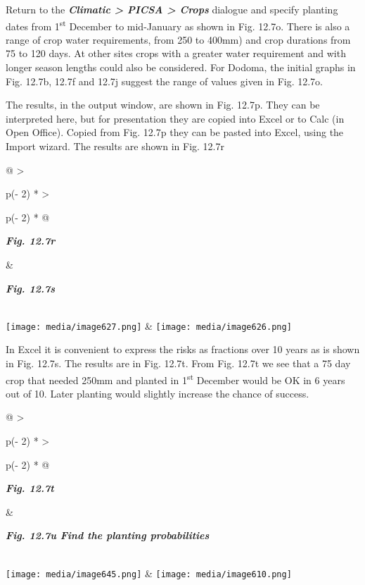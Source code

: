 \documentclass[
  letterpaper,
  DIV=11,
  numbers=noendperiod]{scrreprt}
\begin{document}
Return to the \textbf{\emph{Climatic \textgreater{} PICSA \textgreater{}
Crops}} dialogue and specify planting dates from 1\textsuperscript{st}
December to mid-January as shown in Fig. 12.7o. There is also a range of
crop water requirements, from 250 to 400mm) and crop durations from 75
to 120 days. At other sites crops with a greater water requirement and
with longer season lengths could also be considered. For Dodoma, the
initial graphs in Fig. 12.7b, 12.7f and 12.7j suggest the range of
values given in Fig. 12.7o.

The results, in the output window, are shown in Fig. 12.7p. They can be
interpreted here, but for presentation they are copied into Excel or to
Calc (in Open Office). Copied from Fig. 12.7p they can be pasted into
Excel, using the Import wizard. The results are shown in Fig. 12.7r

\begin{longtable}[]{@{}
  >{\raggedright\arraybackslash}p{(\columnwidth - 2\tabcolsep) * }
  >{\raggedright\arraybackslash}p{(\columnwidth - 2\tabcolsep) * }@{}}
\toprule\noalign{}
\begin{minipage}[b]{\linewidth}\raggedright
\textbf{\emph{Fig. 12.7r}}
\end{minipage} & \begin{minipage}[b]{\linewidth}\raggedright
\textbf{\emph{Fig. 12.7s}}
\end{minipage} \\
\midrule\noalign{}
\endhead
\bottomrule\noalign{}
\endlastfoot
\texttt{[image: media/image627.png]} &
\texttt{[image: media/image626.png]} \\
\end{longtable}

In Excel it is convenient to express the risks as fractions over 10
years as is shown in Fig. 12.7s. The results are in Fig. 12.7t. From
Fig. 12.7t we see that a 75 day crop that needed 250mm and planted in
1\textsuperscript{st} December would be OK in 6 years out of 10. Later
planting would slightly increase the chance of success.

\begin{longtable}[]{@{}
  >{\raggedright\arraybackslash}p{(\columnwidth - 2\tabcolsep) * }
  >{\raggedright\arraybackslash}p{(\columnwidth - 2\tabcolsep) * }@{}}
\toprule\noalign{}
\begin{minipage}[b]{\linewidth}\raggedright
\textbf{\emph{Fig. 12.7t}}
\end{minipage} & \begin{minipage}[b]{\linewidth}\raggedright
\textbf{\emph{Fig. 12.7u Find the planting probabilities}}
\end{minipage} \\
\midrule\noalign{}
\endhead
\bottomrule\noalign{}
\endlastfoot
\texttt{[image: media/image645.png]} &
\texttt{[image: media/image610.png]} \\
\end{longtable}
\end{document}
